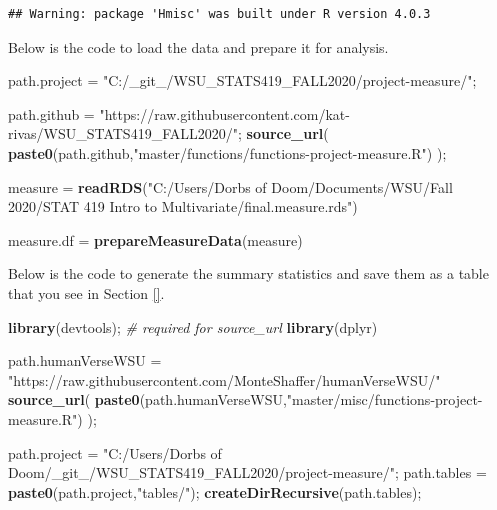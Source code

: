 \documentclass[]{article}
\newenvironment{Shaded}{\begin{snugshade}}{\end{snugshade}}
\newcommand{\CommentTok}[1]{\textcolor[rgb]{0.56,0.35,0.01}{\textit{#1}}}
\newcommand{\KeywordTok}[1]{\textcolor[rgb]{0.13,0.29,0.53}{\textbf{#1}}}
\newcommand{\NormalTok}[1]{#1}
\newcommand{\StringTok}[1]{\textcolor[rgb]{0.31,0.60,0.02}{#1}}
\begin{document}
\begin{verbatim}
## Warning: package 'Hmisc' was built under R version 4.0.3
\end{verbatim}

Below is the code to load the data and prepare it for analysis.

\begin{Shaded}
\begin{Highlighting}[]
\NormalTok{path.project =}\StringTok{ "C:/_git_/WSU_STATS419_FALL2020/project-measure/"}\NormalTok{;}

\NormalTok{path.github =}\StringTok{ "https://raw.githubusercontent.com/kat-rivas/WSU_STATS419_FALL2020/"}\NormalTok{;}
\KeywordTok{source_url}\NormalTok{( }\KeywordTok{paste0}\NormalTok{(path.github,}\StringTok{"master/functions/functions-project-measure.R"}\NormalTok{) );}

\NormalTok{measure =}\StringTok{ }\KeywordTok{readRDS}\NormalTok{(}\StringTok{"C:/Users/Dorbs of Doom/Documents/WSU/Fall 2020/STAT 419 Intro to Multivariate/final.measure.rds"}\NormalTok{)}

\NormalTok{measure.df =}\StringTok{ }\KeywordTok{prepareMeasureData}\NormalTok{(measure)}
\end{Highlighting}
\end{Shaded}

Below is the code to generate the summary statistics and save them as a
table that you see in Section \ref{}.

\begin{Shaded}
\begin{Highlighting}[]
\KeywordTok{library}\NormalTok{(devtools);       }\CommentTok{# required for source_url}
\KeywordTok{library}\NormalTok{(dplyr)}

\NormalTok{path.humanVerseWSU =}\StringTok{ "https://raw.githubusercontent.com/MonteShaffer/humanVerseWSU/"}
\KeywordTok{source_url}\NormalTok{( }\KeywordTok{paste0}\NormalTok{(path.humanVerseWSU,}\StringTok{"master/misc/functions-project-measure.R"}\NormalTok{) );}

\NormalTok{path.project =}\StringTok{ "C:/Users/Dorbs of Doom/_git_/WSU_STATS419_FALL2020/project-measure/"}\NormalTok{;}
\NormalTok{path.tables =}\StringTok{ }\KeywordTok{paste0}\NormalTok{(path.project,}\StringTok{"tables/"}\NormalTok{);}
  \KeywordTok{createDirRecursive}\NormalTok{(path.tables);}
\end{Highlighting}
\end{Shaded}
\end{document}
